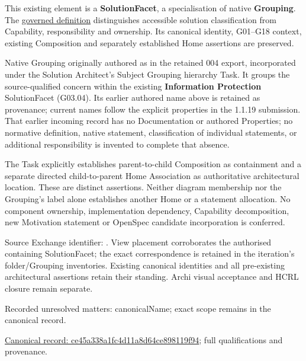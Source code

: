 This existing element is a \textbf{SolutionFacet}, a specialisation of native
\textbf{Grouping}. The \href{\detokenize{../../../../../../../governance/continuum-representation.md#solutionfacet-classification--1119-candidate}}{governed definition}
distinguishes accessible solution classification from Capability, responsibility
and ownership. Its canonical identity, G01–G18 context, existing Composition
and separately established Home assertions are preserved.



Native Grouping originally authored as \texttt{} in the retained 004 export,
incorporated under the Solution Architect's Subject Grouping hierarchy Task.
It groups the source-qualified \texttt{} concern within
the existing \textbf{Information Protection} SolutionFacet (G03.04). Its earlier authored name above is retained as provenance; current names
follow the explicit properties in the 1.1.19 submission.
That earlier incoming record has no Documentation or authored Properties; no normative
definition, native statement, classification of individual statements, or
additional responsibility is invented to complete that absence.



The Task explicitly establishes parent-to-child Composition as containment and
a separate directed child-to-parent Home Association as authoritative architectural
location. These are distinct assertions. Neither diagram membership nor the
Grouping's label alone establishes another Home or a statement allocation.
No component ownership, implementation dependency, Capability decomposition,
new Motivation statement or OpenSpec candidate incorporation is conferred.



Source Exchange identifier: \texttt{}. View placement corroborates
the authorised containing SolutionFacet; the exact correspondence is retained in the
iteration's folder/Grouping inventories. Existing canonical identities and all
pre-existing architectural assertions retain their standing. Archi visual
acceptance and HCRL closure remain separate.


{\small Recorded unresolved matters: canonicalName; exact scope remains in the canonical record.}\par
{\footnotesize \href{../../../../../../../continuum/grouping/ce45a338a1fc4d11a8d64ce898119f94.md}{Canonical record: ce45a338a1fc4d11a8d64ce898119f94}; full qualifications and provenance.}\par
